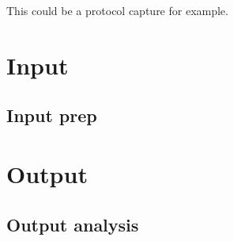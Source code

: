 This could be a protocol capture for example. 

\section{Input}

\subsection{Input prep}

\section{Output}

\subsection{Output analysis}

\clearpage
